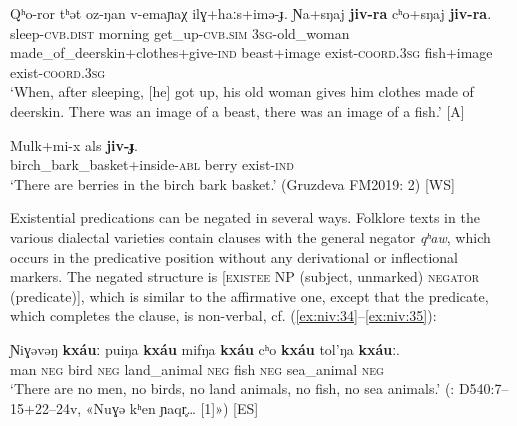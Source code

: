 \documentclass[output=paper,colorlinks,citecolor=brown]{langscibook}
\begin{document}
\ea\label{ex:niv:31}
    \gll Qʰo-ror tʰət oz-ŋan v-emaɲaχ ilɣ+haːs+imə{}-ɟ. Ɲa+sŋaj \textbf{jiv-ra} cʰo+sŋaj \textbf{jiv-ra}.\\ 
         sleep-\textsc{cvb.dist} morning get\_up-\textsc{cvb.sim} \textsc{3sg-}old\_woman made\_of\_deerskin+clothes+give-\textsc{ind} beast+image exist-\textsc{coord.3sg} fish+image exist-\textsc{coord.3sg}\\
    \glt ‘When, after sleeping, [he] got up, his old woman gives him clothes made of deerskin. There was an image of a beast, there was an image of a fish.’ \citep[226]{Panfilov1965} [A]
\z 

\ea\label{ex:niv:32}
    \gll Mulk+mi-x als \textbf{jiv-ɟ}. \\ 
         birch\_bark\_basket+inside-\textsc{abl} berry exist-\textsc{ind} \\
    \glt ‘There are berries in the birch bark basket.’ (Gruzdeva FM2019: 2) [WS]
\z 



Existential predications can be negated in several ways. Folklore texts in the various dialectal varieties contain clauses with the general negator \textit{qʰaw}, which occurs in the predicative position without any derivational or inflectional markers. The negated structure is [\textsc{existee} NP (subject, unmarked) \textsc{negator} (predicate)], which is similar to the affirmative one, except that the predicate, which completes the clause, is non-verbal, cf. (\ref{ex:niv:34}--\ref{ex:niv:35}):

\ea\label{ex:niv:34}
    \gll Ɲiɣəvəŋ \textbf{kxáuː}\footnotemark{} puiŋa \textbf{kxáu} mifŋa \textbf{kxáu} cʰo \textbf{kxáu} tol’ŋa \textbf{kxáuː}.\\ 
         man \textsc{neg} bird \textsc{neg} land\_animal \textsc{neg} fish \textsc{neg} sea\_animal \textsc{neg} \\
    \glt ‘There are no men, no birds, no land animals, no fish, no sea animals.’ (\cite{KreinovichMs}: D540:7–15+22–24v, «Nuɣə kʰen ɲaqr̥… [1]») [ES]
\z
\end{document}

